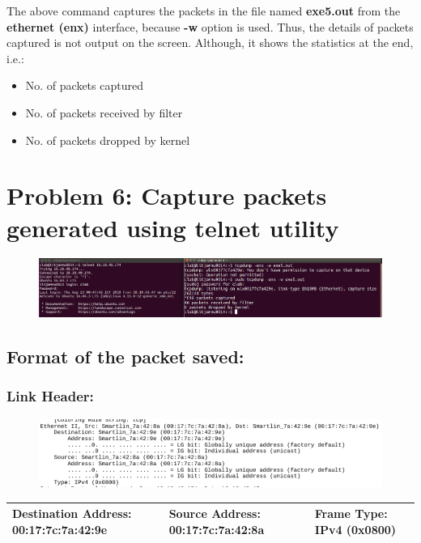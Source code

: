 \documentclass[]{report}
\begin{document}
The above command captures the packets in the file named \textbf{exe5.out} from the \textbf{ethernet (enx)} interface, because \textbf{-w} option is used. Thus, the details of packets captured is not output on the screen. Although, it shows the statistics at the end, i.e.:
\begin{itemize}
	\item No. of packets captured
	\item No. of packets received by filter
	\item No. of packets dropped by kernel
\end{itemize}

\section{Problem 6: Capture packets generated using telnet utility}
\begin{figure}[H]
	\vspace{0pt}
	\includegraphics[width=600pt, keepaspectratio, center]{Snapshots/exe6/telnet.png}
\end{figure}

\subsection{Format of the packet saved:}
\subsubsection{Link Header: }
\begin{figure}[H]
	\vspace{0pt}
	\includegraphics[width=600pt, keepaspectratio, center]{Snapshots/exe6/eth.png}
\end{figure}
\begin{tabular}{ |p{4cm}|p{4cm}|p{4cm}| }
	\hline
	Destination Address: 00:17:7c:7a:42:9e & Source Address: 00:17:7c:7a:42:8a & Frame Type: IPv4 (0x0800) \\
	\hline
\end{tabular}
\end{document}
